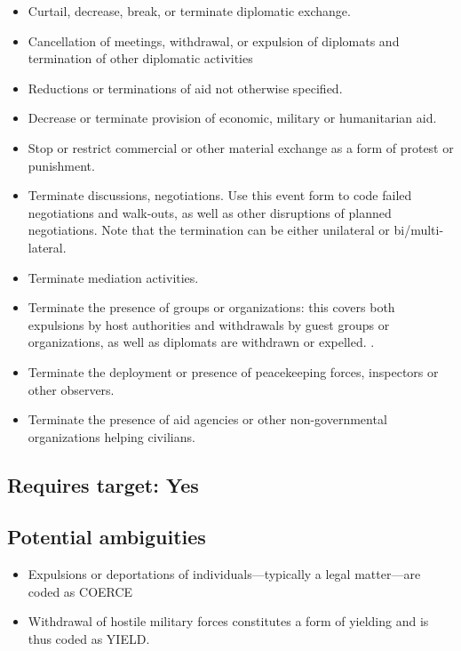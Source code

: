 \documentclass[11pt]{report}
\newcommand{\plcat}[1]{\textsf{#1}}
\begin{document}
\begin{itemize}
\item Curtail, decrease, break, or terminate diplomatic exchange.

\item Cancellation of meetings, withdrawal, or expulsion of diplomats and termination of other diplomatic activities 

\item Reductions or terminations of aid not otherwise specified.
\item Decrease or terminate provision of economic, military or humanitarian aid.
\item Stop or restrict commercial or other material exchange as a form of protest or punishment.
\item Terminate discussions, negotiations. Use this event form to code failed negotiations and walk-outs, as well as other disruptions of planned negotiations. Note that the termination can be either unilateral or bi/multi-lateral.
\item Terminate mediation activities.
\item Terminate the presence of groups or organizations: this covers both expulsions by host authorities and withdrawals by guest groups or organizations, as well as diplomats are withdrawn or expelled. .   \item Terminate the deployment or presence of peacekeeping forces, inspectors or other observers.
\item Terminate the presence of aid agencies or other non-governmental organizations helping civilians.
\end{itemize}

\subsection{Requires target: Yes}

\subsection{Potential ambiguities}

\begin{itemize}
\item Expulsions or deportations of individuals---typically a legal matter---are coded as \plcat{COERCE} 
\item Withdrawal of hostile military forces constitutes a form of yielding and is thus coded as \plcat{YIELD}.
\end{itemize}
\end{document}
